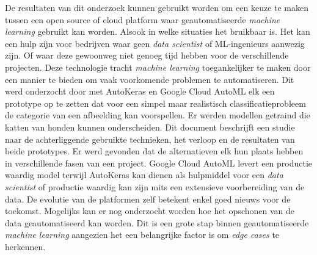 De resultaten van dit onderzoek kunnen gebruikt worden om een keuze te maken tussen een open source of cloud platform waar geautomatiseerde \textit{machine learning} gebruikt kan worden. Alsook in welke situaties het bruikbaar is. Het kan een hulp zijn voor bedrijven waar geen \textit{data scientist} of ML-ingenieurs aanwezig zijn. Of waar deze gewoonweg niet genoeg tijd hebben voor de verschillende projecten. Deze technologie tracht \textit{machine learning} toegankelijker te maken door een manier te bieden om vaak voorkomende problemen te automatiseren. Dit werd onderzocht door met AutoKeras en Google Cloud AutoML elk een prototype op te zetten dat voor een simpel maar realistisch classificatieprobleem de categorie van een afbeelding kan voorspellen. Er werden modellen getraind die katten van honden kunnen onderscheiden. Dit document beschrijft een studie naar de achterliggende gebruikte technieken, het verloop en de resultaten van beide prototypes. Er werd gevonden dat de alternatieven elk hun plaats hebben in verschillende fasen van een project. Google Cloud AutoML levert een productie waardig model terwijl AutoKeras kan dienen als hulpmiddel voor een \textit{data scientist} of productie waardig kan zijn mits een extensieve voorbereiding van de data. De evolutie van de platformen zelf betekent enkel goed nieuws voor de toekomst. Mogelijks kan er nog onderzocht worden hoe het opschonen van de data geautomatiseerd kan worden. Dit is een grote stap binnen geautomatiseerde \textit{machine learning} aangezien het een belangrijke factor is om \textit{edge cases} te herkennen.